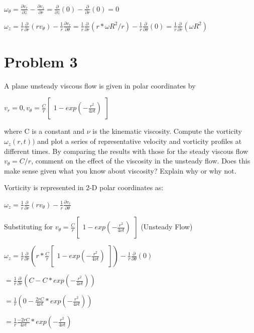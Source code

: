 \documentclass{article}
\begin{document}
$\omega_{\theta} = \frac{\partial v_{r}}{\partial z}-\frac{\partial
v_{z}}{\partial r} = \frac{\partial}{\partial z}(0)-\frac{\partial}{\partial r}(0) = 0$

$\omega_{z} = \frac{1}{r}\frac{\partial}{\partial r}(rv_{\theta}) -
\frac{1}{r}\frac{\partial v_{r}}{\partial \theta} = \frac{1}{r}\frac{\partial}{\partial r}(r*\omega R^{2}/r) -
\frac{1}{r}\frac{\partial}{\partial \theta}(0) = \frac{1}{r}\frac{\partial}{\partial r}(\omega R^{2})$

\section*{Problem 3}
A plane unsteady viscous flow is given in polar coordinates by

$v_{r} = 0, v_{\theta } = \frac{C}{r} \begin{bmatrix}
1 - exp(-\frac{r^{2}}{4\nu t})
\end{bmatrix}$

where C is a constant and $\nu$ is the kinematic viscosity. Compute the
vorticity $\omega_{z}(r,t))$ and plot a series of representative velocity and
vorticity profiles at different times. By comparing the results with those for
the steady viscous flow $v_{\theta } = C/r$, comment on the effect of the
viscosity in the unsteady flow. Does this make sense given what you know about
viscosity? Explain why or why not.



Vorticity is represented in 2-D polar coordinates as:

$\omega_{z} = \frac{1}{r}\frac{\partial}{\partial r}(rv_{\theta}) - \frac{1}{r}\frac{\partial v_{r}}{\partial \theta}$

Substituting for $v_{\theta } = \frac{C}{r} \begin{bmatrix}1 - exp(-\frac{r^{2}}{4\nu t})\end{bmatrix}$ (Unsteady Flow)

$\omega_{z} = \frac{1}{r}\frac{\partial}{\partial r}(r*\frac{C}{r} \begin{bmatrix}1 - exp(-\frac{r^{2}}{4\nu t})\end{bmatrix}) - \frac{1}{r}\frac{\partial}{\partial \theta}(0) $

$ = \frac{1}{r}\frac{\partial}{\partial r}(C - C*exp(-\frac{r^{2}}{4\nu t}))$

$ = \frac{1}{r}(0 - \frac{2rC}{4\nu t}*exp(-\frac{r^{2}}{4\nu t}))$

$ = \frac{1}{r}\frac{-2rC}{4\nu t}*exp(-\frac{r^{2}}{4\nu t})$
\end{document}
